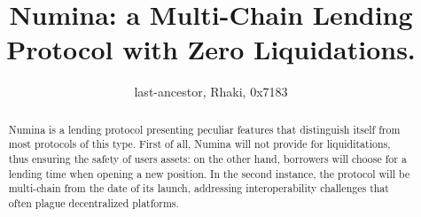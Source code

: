 \documentclass[12pt]{paper}
\title{Numina: a Multi-Chain Lending Protocol with Zero Liquidations.}
\author{last-ancestor, Rhaki, 0x7183}
\date{}
\begin{document}
\maketitle


\begin{abstract}
	Numina is a lending protocol presenting peculiar features that distinguish itself from most protocols of this type. First of all, Numina will not provide for liquiditations, thus ensuring the safety of users assets: on the other hand, borrowers will choose for a lending time when opening a new position. In the second instance, the protocol will be multi-chain from the date of its launch, addressing interoperability challenges that often plague decentralized platforms.
\end{abstract}
	
\end{document}
